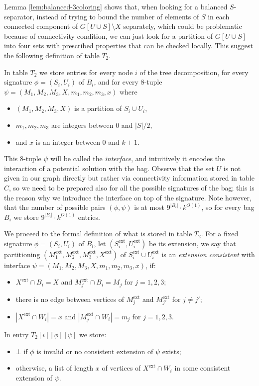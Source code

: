 \documentclass[a4paper,11pt]{article}
\theoremstyle{definition}
\theoremstyle{remark}
\newcommand{\ext}{\textrm{ext}}
\begin{document}
Lemma \ref{lem:balanced-3coloring} shows that, when looking for a
balanced $S$-separator, instead of trying to bound the number of
elements of $S$ in each connected component of $G[U\cup S]\setminus X$
separately, which could be problematic because of connectivity
condition, we can just look for a partition of $G[U\cup S]$ into four
sets with prescribed properties that can be checked locally.  This
suggest the following definition of table $T_2$.

In table $T_2$ we store entries for every node $i$ of the tree
decomposition, for every signature $\phi=(S_i,U_i)$ of $B_i$, and for
every $8$-tuple $\psi=(M_1,M_2,M_3,X,m_1,m_2,m_3,x)$ where
\begin{itemize}
\item $(M_1,M_2,M_3,X)$ is a partition of $S_i\cup U_i$,
\item $m_1,m_2,m_3$ are integers between $0$ and $|S|/2$,
\item and $x$ is an integer between $0$ and $k+1$.
\end{itemize}
This $8$-tuple $\psi$ will be called the {\emph{interface}}, and
intuitively it encodes the interaction of a potential solution with
the bag.  Observe that the set $U$ is not given in our graph directly but
rather via connectivity information stored in table $C$, so we need to
be prepared also for all the possible signatures of the bag; this is
the reason why we introduce the interface on top of the signature.
Note however, that the number of possible pairs $(\phi,\psi)$ is at
most $9^{|B_i|}\cdot k^{O(1)}$, so for every bag $B_i$ we store
$9^{|B_i|}\cdot k^{O(1)}$ entries.

We proceed to the formal definition of what is stored in table $T_2$.
For a fixed signature $\phi=(S_i,U_i)$ of $B_i$, let
$(S^{\ext}_i,U^{\ext}_i)$ be its extension, we say that partitioning
$(M^{\ext}_1, M^{\ext}_2, M^{\ext}_3, X^{\ext})$ of $S^{\ext}_i\cup
U^{\ext}_i$ is an {\emph{extension consistent}} with interface
$\psi=(M_1,M_2,M_3,X,m_1,m_2,m_3,x)$, if:
\begin{itemize}
\item $X^{\ext}\cap B_i=X$ and $M^{\ext}_j\cap B_i=M_j$ for $j=1,2,3$;
\item there is no edge between vertices of $M^{\ext}_j$ and
  $M^{\ext}_{j'}$ for $j\neq j'$;
\item $|X^{\ext}\cap W_i|=x$ and $|M_j^{\ext}\cap W_i|=m_j$ for $j=1,2,3$.
\end{itemize}

In entry $T_2[i][\phi][\psi]$ we store:
\begin{itemize}
\item $\bot$ if $\phi$ is invalid or no consistent extension of $\psi$ exists;
\item otherwise, a list of length $x$ of vertices of $X^{\ext}\cap W_i$
  in some consistent extension of $\psi$.
\end{itemize}
\end{document}
